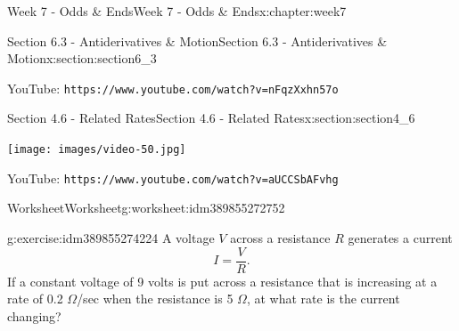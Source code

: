 \documentclass[oneside,10pt,]{book}
\newcommand{\mono}[1]{\texttt{#1}}
\numberwithin{equation}{section}
\newlength{\qrsize}
\newlength{\previewwidth}
\begin{document}
\begin{chapterptx}{Week 7 - Odds \& Ends}{}{Week 7 - Odds \& Ends}{}{}{x:chapter:week7}
\begin{sectionptx}{Section 6.3 - Antiderivatives \& Motion}{}{Section 6.3 - Antiderivatives \& Motion}{}{}{x:section:section6_3}
\begin{tcbraster}[raster columns=2, raster column skip=1pt, raster halign=center, raster force size=false, raster left skip=0pt, raster right skip=0pt]
\begin{tcolorbox}[qrstyle]
{\hypersetup{urlcolor=black}}%
\end{tcolorbox}%
\begin{tcolorbox}[captionstyle]%
\small YouTube: \mono{https://www.youtube.com/watch?v=nFqzXxhn57o}\end{tcolorbox}%
\end{tcbraster}%
\end{sectionptx}
%
%
\typeout{************************************************}
\typeout{************************************************}
%
\begin{sectionptx}{Section 4.6 - Related Rates}{}{Section 4.6 - Related Rates}{}{}{x:section:section4_6}
\setlength{\qrsize}{9em}
\setlength{\previewwidth}{\linewidth}
\addtolength{\previewwidth}{-\qrsize}
\begin{tcbraster}[raster columns=2, raster column skip=1pt, raster halign=center, raster force size=false, raster left skip=0pt, raster right skip=0pt]%
\begin{tcolorbox}[previewstyle, width=\previewwidth]%
\texttt{[image: images/video-50.jpg]}%
\end{tcolorbox}%
\begin{tcolorbox}[qrstyle]%
{\hypersetup{urlcolor=black}}%
\end{tcolorbox}%
\begin{tcolorbox}[captionstyle]%
\small YouTube: \mono{https://www.youtube.com/watch?v=aUCCSbAFvhg}\end{tcolorbox}%
\end{tcbraster}%
%
%
\typeout{************************************************}
\typeout{************************************************}
%
\begin{worksheet-subsection}{Worksheet}{}{Worksheet}{}{}{g:worksheet:idm389855272752}
\begin{divisionexercise}{1}{}{}{g:exercise:idm389855274224}%
\footnotemark{}A voltage \(V\) across a resistance \(R\) generates a current%
%
\begin{equation*}
I = \frac VR . 
\end{equation*}
If a constant voltage of \textdollar{}9\textdollar{} volts is put across a resistance that is increasing at a rate of 0.2 \(\Omega\)\slash{}sec when the resistance is 5 \(\Omega\), at what rate is the current changing?%

\end{divisionexercise}
\end{worksheet-subsection}
\end{sectionptx}
\end{chapterptx}
\end{document}
